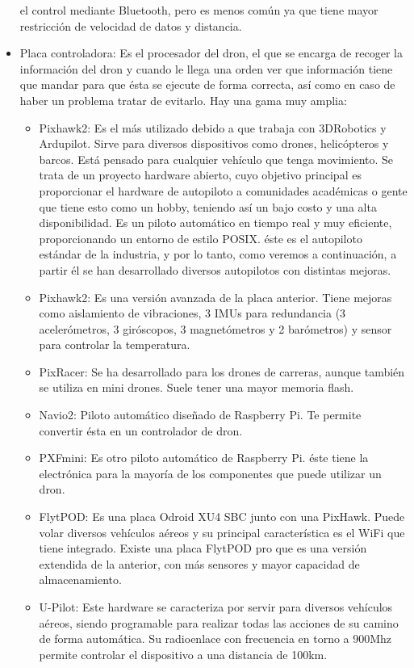 \begin{itemize}
el control mediante Bluetooth, pero es menos común ya que tiene mayor restricción de
velocidad de datos y distancia.
\item Placa controladora: Es el procesador del dron, el que se encarga de recoger
la información del dron y cuando le llega una orden ver que información tiene que
mandar para que ésta se ejecute de forma correcta, así como en caso de haber un
problema tratar de evitarlo. Hay una gama muy amplia:
	\begin{itemize}
	\item Pixhawk2: Es el más utilizado debido a que trabaja con 3DRobotics y Ardupilot.
Sirve para diversos dispositivos como drones, helicópteros y barcos. Está pensado
para cualquier vehículo que tenga movimiento. Se trata de un proyecto hardware
abierto, cuyo objetivo principal es proporcionar el hardware de autopiloto a
comunidades académicas o gente que tiene esto como un hobby, teniendo así
un bajo costo y una alta disponibilidad. Es un piloto automático en tiempo real
y muy eficiente, proporcionando un entorno de estilo POSIX. éste es el autopiloto
estándar de la industria, y por lo tanto, como veremos a continuación, a partir
él se han desarrollado diversos autopilotos con distintas mejoras.
	\item Pixhawk2: Es una versión avanzada de la placa anterior. Tiene mejoras
como aislamiento de vibraciones, 3 IMUs para redundancia (3 acelerómetros,
3 giróscopos, 3 magnetómetros y 2 barómetros) y sensor para controlar la
temperatura.
	\item PixRacer: Se ha desarrollado para los drones de carreras, aunque también se
utiliza en mini drones. Suele tener una mayor memoria flash.
	\item Navio2: Piloto automático diseñado de Raspberry Pi. Te permite convertir ésta
en un controlador de dron.
	\item PXFmini: Es otro piloto automático de Raspberry Pi. éste tiene la electrónica
para la mayoría de los componentes que puede utilizar un dron.
	\item FlytPOD: Es una placa Odroid XU4 SBC junto con una PixHawk. Puede
volar diversos vehículos aéreos y su principal característica es el WiFi que tiene
integrado. Existe una placa FlytPOD pro que es una versión extendida de la
anterior, con más sensores y mayor capacidad de almacenamiento.
	\item U-Pilot: Este hardware se caracteriza por servir para diversos vehículos aéreos,
siendo programable para realizar todas las acciones de su camino de forma
automática. Su radioenlace con frecuencia en torno a 900Mhz permite controlar
el dispositivo a una distancia de 100km.
	\end{itemize}

\end{itemize}

